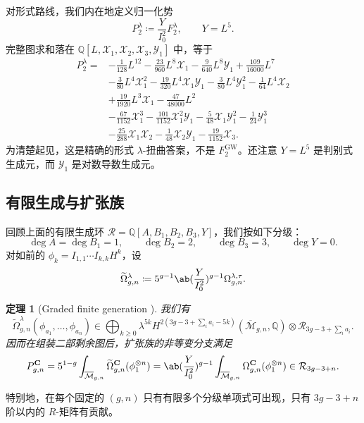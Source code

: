 \documentclass{amsart}
\newtheorem{thm}{定理}[section]
\theoremstyle{definition}
\theoremstyle{remark}
\theoremstyle{plain}
\theoremstyle{definition}
\theoremstyle{remark}
\newcommand{\Q}{\mathbb{Q}}
\newcommand{\Mbar}{\overline{\mathcal{M}}}
\newcommand{\mc}[1]{\mathcal{#1}}
\newcommand{\mbf}[1]{\mathbf{#1}}
\newcommand{\mr}[1]{\mathrm{#1}}
\newcommand{\wt}[1]{\widetilde{#1}}
\newcommand{\1}{\mathbf{1}}
\newcommand{\2}{\mathbf{2}}
\newcommand{\3}{\mathbf{3}}
\begin{document}
对形式路线，我们内在地定义归一化势
\[ P_2^{\lambda} \coloneqq \frac{Y}{I_0^2}F_2^{\lambda}, \qquad Y = L^5. \]
完整图求和落在 \(\Q[L,\mc{X}_1,\mc{X}_2,\mc{X}_3,\mc{Y}_1]\) 中，等于
\begin{align*}
    P_2^{\lambda} ={}& -\frac{1}{128}L^{12} - \frac{23}{960}L^8\mc{X}_1 - \frac{9}{640}L^8\mc{Y}_1 + \frac{109}{16000}L^7 \\
    &- \frac{3}{80}L^4\mc{X}_1^2 - \frac{19}{320}L^4\mc{X}_1\mc{Y}_1 - \frac{3}{80}L^4\mc{Y}_1^2 - \frac{1}{64}L^4\mc{X}_2 \\
    &+ \frac{19}{1920}L^3\mc{X}_1 - \frac{47}{48000}L^2 \\
    &- \frac{67}{1152}\mc{X}_1^3 - \frac{101}{1152}\mc{X}_1^2\mc{Y}_1 - \frac{5}{48}\mc{X}_1\mc{Y}_1^2 - \frac{1}{24}\mc{Y}_1^3 \\
    &- \frac{25}{288}\mc{X}_1\mc{X}_2 - \frac{1}{48}\mc{X}_2\mc{Y}_1 - \frac{19}{1152}\mc{X}_3.
\end{align*}
为清楚起见，这是精确的形式 \(\lambda\)-扭曲答案，不是 \(F_2^{\mr{GW}}\)。还注意 \(Y = L^5\) 是判别式生成元，而 \(\mc{Y}_1\) 是对数导数生成元。

\subsection{有限生成与扩张族}%
\label{sub:Finite generation and the extended family}

回顾上面的有限生成环 \(\mc{R} = \Q[A,B_1,B_2,B_3,Y]\)，我们按如下分级：
\[ \deg A = \deg B_1 = 1, \qquad \deg B_2 = 2, \qquad \deg B_3 = 3, \qquad \deg Y = 0. \]
对如前的 \(\phi_k = I_{1,1}\cdots I_{k,k}H^k\)，设
\[ \wt{\Omega}^{\lambda}_{g,n} \coloneqq 5^{g-1}\ab(\frac{Y}{I_0^2})^{g-1}\Omega^{\lambda,\tau}_{g,n}. \]

\begin{thm}[Graded finite generation {\cite{GJRstructure}}]%
\label{thm:graded finite generation}
    我们有
    \[ \wt{\Omega}^{\lambda}_{g,n}(\phi_{a_1}, \ldots, \phi_{a_n}) \in \bigoplus_{k \geq 0}\lambda^{5k}H^{2(3g-3+\sum_i a_i - 5k)}(\Mbar_{g,n},\Q)\otimes \mc{R}_{3g-3+\sum_i a_i}. \]
    因而在组装二部剩余图后，扩张族的非等变分支满足
    \[ P^{\mbf{C}}_{g,n} = 5^{1-g}\int_{\Mbar_{g,n}}\wt{\Omega}^{\mbf{C}}_{g,n}(\phi_1^{\otimes n}) = \ab( \frac{Y}{I_0^2})^{g-1}\int_{\Mbar_{g,n}}\Omega^{\mbf{C}}_{g,n}(\phi_1^{\otimes n}) \in \mc{R}_{3g-3+n}. \]
\end{thm}

特别地，在每个固定的 \((g,n)\) 只有有限多个分级单项式可出现，只有 \(3g-3+n\) 阶以内的 \(R\)-矩阵有贡献。
\end{document}
